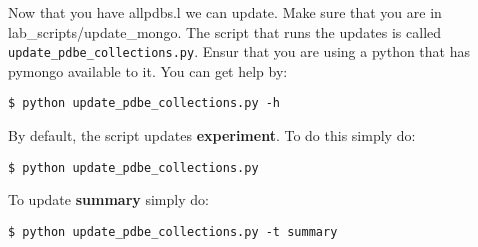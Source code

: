 \documentclass[12pt]{article}
\newcommand{\cmdline}[1]{\vspace{5mm} \noindent
\texttt{\$ #1}
\vspace{5mm}

}
\newcommand{\mdbcol}[1]{{\color{Bittersweet}\textbf{#1}}}
\begin{document}
\noindent
Now that you have allpdbs.l we can update. Make sure that you are in\\lab\_scripts/update\_mongo. The script that runs the updates is called\\ \texttt{update\_pdbe\_collections.py}. Ensur that you are using a python that has pymongo available to it. You can get help by:

\cmdline{python update\_pdbe\_collections.py -h}

\noindent
By default, the script updates \mdbcol{experiment}. To do this simply do:

\cmdline{python update\_pdbe\_collections.py}

\noindent
To update \mdbcol{summary} simply do:

\cmdline{python update\_pdbe\_collections.py -t summary}
\end{document}
